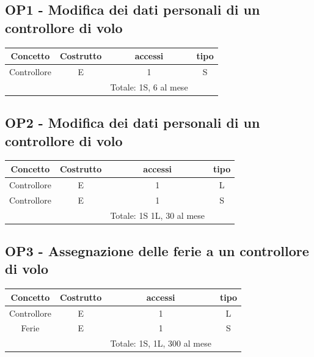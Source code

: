 \subsection*{OP1 - Modifica dei dati personali di un controllore di volo}
\begin{table}[H]
  \centering
  \begin{tabular}{|c|c|c|c|}
  \hline
  \rowcolor{green!70!black!80}
  \textbf{Concetto} & \textbf{Costrutto} & \textbf{accessi} & \textbf{tipo}\\
  \hline
  Controllore & E & 1 & S \\
  &  & Totale: 1S, 6 al mese &\\
  \hline
  \end{tabular}
  \end{table}

    \subsection*{OP2 - Modifica dei dati personali di un controllore di volo}
    \begin{table}[H]
      \centering
      \begin{tabular}{|c|c|c|c|}
      \hline
      \rowcolor{green!70!black!80}
      \textbf{Concetto} & \textbf{Costrutto} & \textbf{accessi} & \textbf{tipo}\\
      \hline
      Controllore & E & 1 & L \\
      Controllore & E & 1 & S \\
      &  & Totale: 1S 1L, 30 al mese &\\
      \hline
      \end{tabular}
      \end{table}
  
      \subsection*{OP3 - Assegnazione delle ferie a un controllore di volo}
      \begin{table}[H]
    \centering
    \begin{tabular}{|c|c|c|c|}
    \hline
    \rowcolor{green!70!black!80}
    \textbf{Concetto} & \textbf{Costrutto} & \textbf{accessi} & \textbf{tipo}\\
    \hline
    Controllore & E & 1 & L \\
    Ferie & E & 1 & S \\
    & & Totale: 1S, 1L, 300 al mese &\\
    \hline
    \end{tabular}
    \end{table}

